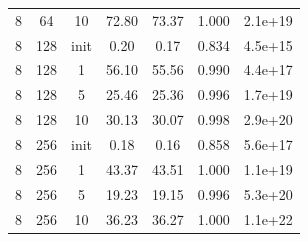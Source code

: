 \begin{tabular}{ccccccc}
8 & 64 & 10 & 72.80 & 73.37 & 1.000 & 2.1e+19 \\
8 & 128 & init & 0.20 & 0.17 & 0.834 & 4.5e+15 \\
8 & 128 & 1 & 56.10 & 55.56 & 0.990 & 4.4e+17 \\
8 & 128 & 5 & 25.46 & 25.36 & 0.996 & 1.7e+19 \\
8 & 128 & 10 & 30.13 & 30.07 & 0.998 & 2.9e+20 \\
8 & 256 & init & 0.18 & 0.16 & 0.858 & 5.6e+17 \\
8 & 256 & 1 & 43.37 & 43.51 & 1.000 & 1.1e+19 \\
8 & 256 & 5 & 19.23 & 19.15 & 0.996 & 5.3e+20 \\
8 & 256 & 10 & 36.23 & 36.27 & 1.000 & 1.1e+22 \\
\bottomrule
\end{tabular}
